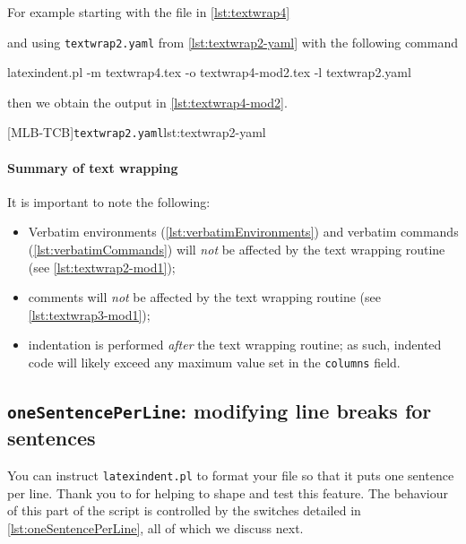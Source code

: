 	For example starting with the file in \cref{lst:textwrap4} 

	 and using \texttt{textwrap2.yaml} from \cref{lst:textwrap2-yaml} with the following command \begin{commandshell}
latexindent.pl -m textwrap4.tex -o textwrap4-mod2.tex -l textwrap2.yaml
\end{commandshell} then we obtain the output in \cref{lst:textwrap4-mod2}.

	\begin{minipage}{.45\linewidth}
	\end{minipage}
	\hfill
	\begin{minipage}{.45\linewidth}
		[MLB-TCB]{\texttt{textwrap2.yaml}}{lst:textwrap2-yaml}
	\end{minipage}

	\paragraph{Summary of text wrapping}
		It is important to note the following: \begin{itemize} \item Verbatim environments (\vref{lst:verbatimEnvironments}) and verbatim commands (\vref{lst:verbatimCommands}) will \emph{not} be affected by the text wrapping routine (see \vref{lst:textwrap2-mod1});
			\item comments will \emph{not} be affected by the text wrapping routine (see \vref{lst:textwrap3-mod1});
			\item indentation is performed \emph{after} the text wrapping routine; as such, indented code will likely exceed any maximum value set in the \texttt{columns} field.
		\end{itemize}

\subsection{\texttt{oneSentencePerLine}: modifying line breaks for sentences}
	\label{sec:onesentenceperline}
	You can instruct \texttt{latexindent.pl} to format  your file so that it puts one sentence per line.
	Thank you to \cite{mlep} for helping to shape and test this feature.
	The behaviour of this part of the script is controlled by the switches detailed in \cref{lst:oneSentencePerLine}, all of which we discuss next.

